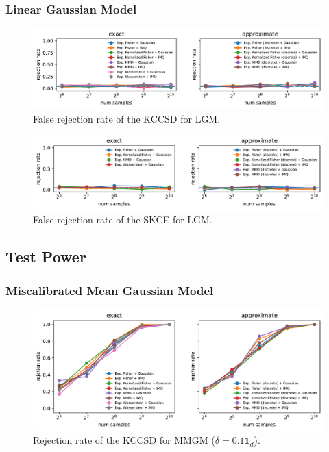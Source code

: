 \documentclass{uai2023} %
\begin{document}
\subsubsection{Linear Gaussian Model}

\begin{figure}[!htb]
    \centering
    \includegraphics[width=\linewidth]{paper/figures/lgm_kccsd.pdf}
    \caption{False rejection rate of the KCCSD for LGM.}
    \label{fig:lgm_kccsd}
\end{figure}

\begin{figure}[!htb]
    \centering
    \includegraphics[width=\linewidth]{paper/figures/lgm_skce.pdf}
    \caption{False rejection rate of the SKCE for LGM.}
    \label{fig:lg_skce}
\end{figure}

\subsection{Test Power}

\subsubsection{Miscalibrated Mean Gaussian Model}

\begin{figure}[!htb]
    \centering
    \includegraphics[width=\linewidth]{paper/figures/pmgm_kccsd_delta=0.1_shift-dim=-1.pdf}
    \caption{Rejection rate of the KCCSD for MMGM ($\delta = 0.1 \mathbf{1}_d$).}
    \label{fig:pmgm_kccsd_all}
\end{figure}
\end{document}

